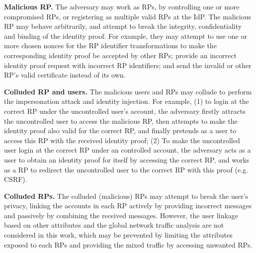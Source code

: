 \textbf{Malicious RP.} %
The adversary may work as RPs, by controlling one or more compromised RPs, or registering as multiple valid RPs at the IdP.
The malicious RP may behave arbitrarily, and attempt to break the integrity, confidentiality and binding of the identity proof.
For example, they may attempt to use one or more chosen nonces for the RP  identifier transformations to make the corresponding identity proof be  accepted by other RPs;
provide an incorrect identity proof request with incorrect RP identifiers;
and send the invalid or other RP's valid certificate instead of its own.


\textbf{Colluded RP and users.} The malicious users and RPs may collude to perform the impersonation attack and identity injection.
For example, (1) to login at the correct RP under the uncontrolled user's account, the adversary firstly attracts the uncontrolled user to access the malicious RP, then attempts to make the identity proof also valid for the correct RP, and finally pretends as a user to access this RP with the received identity proof;
(2) To make the uncontrolled user login at the correct RP under an controlled account, the adversary acts as a user to obtain an identity proof for itself by accessing the correct RP, and works as a RP to redirect the uncontrolled user to the correct RP with this proof (e.g. CSRF).

\textbf{Colluded RPs.} The colluded (malicious) RPs may attempt to break the user's privacy, linking the accounts in each RP actively by providing incorrect messages
and passively by combining the received messages.
However, the user linkage based on other attributes and the global network traffic analysis are not considered in this work,
which may be prevented by limiting the attributes exposed to each RPs and providing the mixed traffic by accessing unwanted RPs.

